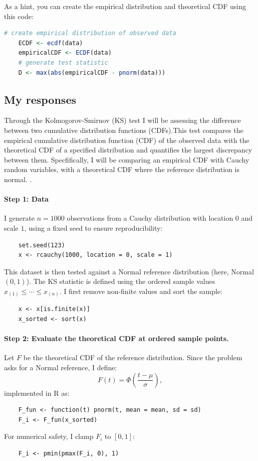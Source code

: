 \documentclass[12pt,letterpaper]{article}
\begin{document}
	
\noindent As a hint, you can create the empirical distribution and theoretical CDF using this code:

\begin{lstlisting}[language=R]
	# create empirical distribution of observed data
	ECDF <- ecdf(data)
	empiricalCDF <- ECDF(data)
	# generate test statistic
	D <- max(abs(empiricalCDF - pnorm(data))) \end{lstlisting}



\subsection*{My responses}
Through the Kolmogorov-Smirnov (KS) test I will be assessing the difference between two cumulative distribution functions (CDFs).This test compares the empirical cumulative distribution function (CDF) of the observed data with the theoretical CDF of a specified distribution and quantifies the largest discrepancy between them. Specfifically, I will be comparing an empirical CDF with Cauchy random variables, with a theoretical CDF where the reference distribution is normal. .

\paragraph{Step 1: Data}
I generate $n=1000$ observations from a Cauchy distribution with location $0$ and scale $1$, using a fixed seed to ensure reproducibility:
\begin{verbatim}
	set.seed(123)
	x <- rcauchy(1000, location = 0, scale = 1)
\end{verbatim}
This dataset is then tested against a Normal reference distribution (here, Normal$(0,1)$). The KS statistic is defined using the ordered sample values $x_{(1)} \le \cdots \le x_{(n)}$. I first remove non-finite values and sort the sample:
\begin{verbatim}
	x <- x[is.finite(x)]
	x_sorted <- sort(x)
\end{verbatim}

\paragraph{Step 2: Evaluate the theoretical CDF at ordered sample points.}
Let $F$ be the theoretical CDF of the reference distribution. Since the problem asks for a Normal reference, I define:
\[
F(t) = \Phi\!\left(\frac{t-\mu}{\sigma}\right),
\]
implemented in R as:
\begin{verbatim}
	F_fun <- function(t) pnorm(t, mean = mean, sd = sd)
	F_i <- F_fun(x_sorted)
\end{verbatim}
For numerical safety, I clamp $F_i$ to $[0,1]$:
\begin{verbatim}
	F_i <- pmin(pmax(F_i, 0), 1)
\end{verbatim}
\end{document}
